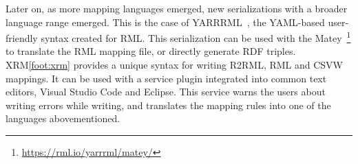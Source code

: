 Later on, as more mapping languages emerged, new serializations with a broader language range emerged. This is the case of YARRRML~\parencite{Heyvaert2018yarrrml}, the YAML-based user-friendly syntax created for RML. This serialization can be used with the Matey~\footnote{\url{https://rml.io/yarrrml/matey/}} to translate the RML mapping file, or directly generate RDF triples. 
XRM\cref{foot:xrm} provides a unique syntax for writing R2RML, RML and CSVW mappings. It can be used with a service plugin integrated into common text editors, Visual Studio Code and Eclipse. This service warns the users about writing errors while writing, and translates the mapping rules into one of the languages abovementioned. 




